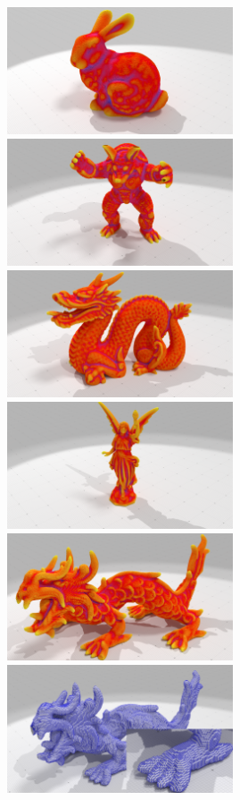 \begin{figure}[ht]{
  \begin{center}
      \includegraphics[width=6.7cm]{images/Curvature/ii_grid}
      \includegraphics[width=6.7cm]{images/Curvature/ii_arma} \\
      \includegraphics[width=6.7cm]{images/Curvature/ii_dragon512}
      \includegraphics[width=6.7cm]{images/Curvature/ii_lucy} \\
      \includegraphics[width=6.7cm]{images/Curvature/ii_xyz512}
      \includegraphics[width=6.7cm]{images/Curvature/ii_xyzpindir1-zoom}

\end{center}}
\end{figure}
